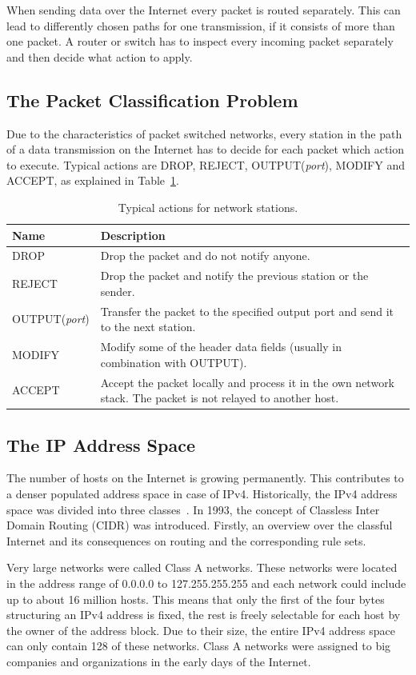 \documentclass[a4paper,
		12pt,
		parskip=full,
		titlepage
		]{scrartcl}
\begin{document}
When sending data over the Internet every packet is routed separately.
This can lead to differently chosen paths for one transmission, if it consists of more than one packet.
A router or switch has to inspect every incoming packet separately and then decide what action to apply.

\subsection{The Packet Classification Problem}
Due to the characteristics of packet switched networks, every station in the path of a data transmission on the Internet 
has to decide for each packet which action to execute.
Typical actions are DROP, REJECT, OUTPUT(\textit{port}), MODIFY and ACCEPT, as explained in Table~\ref{table:actions}.

\begin{table}
  \centering
  \begin{tabularx}{\textwidth}{l|X}
  Name&Description\\
  \hline
  DROP&Drop the packet and do not notify anyone.\\
  REJECT&Drop the packet and notify the previous station or the sender.\\
  OUTPUT(\textit{port})&Transfer the packet to the specified output port and send it to the next station.\\
  MODIFY&Modify some of the header data fields (usually in combination with OUTPUT).\\
  ACCEPT&Accept the packet locally and process it in the own network stack. The packet is not relayed to another host.\\
  \end{tabularx}
  \caption{Typical actions for network stations.}
  \label{table:actions}
\end{table}

\subsection{The IP Address Space}
The number of hosts on the Internet is growing permanently.
This contributes to a denser populated address space in case of IPv4.
Historically, the IPv4 address space was divided into three classes~\cite{rfc1466}.
In 1993, the concept of Classless Inter Domain Routing (CIDR) was introduced.
Firstly, an overview over the classful Internet and its consequences on routing and the corresponding rule sets.

Very large networks were called Class A networks.
These networks were located in the address range of 0.0.0.0 to 127.255.255.255 and each network could include up to about 16 million hosts.
This means that only the first of the four bytes structuring an IPv4 address is fixed, the rest is freely selectable for each host by the owner of the address block.
Due to their size, the entire IPv4 address space can only contain 128 of these networks.
Class A networks were assigned to big companies and organizations in the early days of the Internet.
\end{document}
